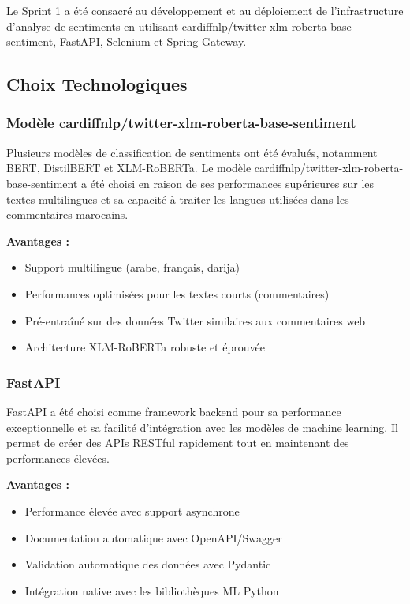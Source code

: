 Le Sprint 1 a été consacré au développement et au déploiement de l'infrastructure d'analyse de sentiments en utilisant cardiffnlp/twitter-xlm-roberta-base-sentiment, FastAPI, Selenium et Spring Gateway.

\subsection{Choix Technologiques}

\subsubsection{Modèle cardiffnlp/twitter-xlm-roberta-base-sentiment}

Plusieurs modèles de classification de sentiments ont été évalués, notamment BERT, DistilBERT et XLM-RoBERTa. Le modèle cardiffnlp/twitter-xlm-roberta-base-sentiment a été choisi en raison de ses performances supérieures sur les textes multilingues et sa capacité à traiter les langues utilisées dans les commentaires marocains.

\textbf{Avantages :}
\begin{itemize}
    \item Support multilingue (arabe, français, darija)
    \item Performances optimisées pour les textes courts (commentaires)
    \item Pré-entraîné sur des données Twitter similaires aux commentaires web
    \item Architecture XLM-RoBERTa robuste et éprouvée
\end{itemize}

\subsubsection{FastAPI}

FastAPI a été choisi comme framework backend pour sa performance exceptionnelle et sa facilité d'intégration avec les modèles de machine learning. Il permet de créer des APIs RESTful rapidement tout en maintenant des performances élevées.

\textbf{Avantages :}
\begin{itemize}
    \item Performance élevée avec support asynchrone
    \item Documentation automatique avec OpenAPI/Swagger
    \item Validation automatique des données avec Pydantic
    \item Intégration native avec les bibliothèques ML Python
\end{itemize}

